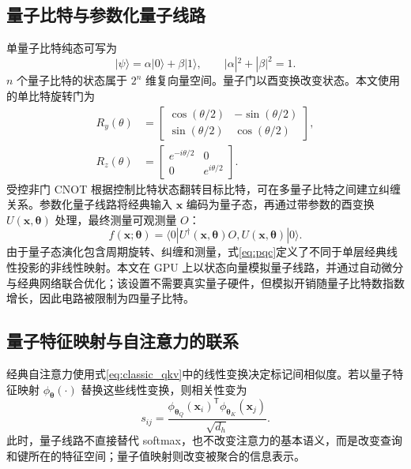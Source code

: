 \documentclass[journal]{IEEEtran}
\begin{document}
\subsection{量子比特与参数化量子线路}

单量子比特纯态可写为
\begin{equation}
  |\psi\rangle=\alpha|0\rangle+\beta|1\rangle,
  \qquad |\alpha|^2+|\beta|^2=1.
\end{equation}
$n$ 个量子比特的状态属于 $2^n$ 维复向量空间。量子门以酉变换改变状态。本文使用的单比特旋转门为
\begin{align}
  R_y(\theta)&=
  \begin{bmatrix}
    \cos(\theta/2)&-\sin(\theta/2)\\
    \sin(\theta/2)& \cos(\theta/2)
  \end{bmatrix},\\
  R_z(\theta)&=
  \begin{bmatrix}
    e^{-i\theta/2}&0\\
    0&e^{i\theta/2}
  \end{bmatrix}.
\end{align}
受控非门 CNOT 根据控制比特状态翻转目标比特，可在多量子比特之间建立纠缠关系。参数化量子线路将经典输入 $\bm{x}$ 编码为量子态，再通过带参数的酉变换 $U(\bm{x},\bm{\theta})$ 处理，最终测量可观测量 $O$：
\begin{equation}
  f(\bm{x};\bm{\theta})=
  \langle0|U^{\dagger}(\bm{x},\bm{\theta})
  O,U(\bm{x},\bm{\theta})|0\rangle.
  \label{eq:pqc}
\end{equation}
由于量子态演化包含周期旋转、纠缠和测量，式\eqref{eq:pqc}定义了不同于单层经典线性投影的非线性映射。本文在 GPU 上以状态向量模拟量子线路，并通过自动微分与经典网络联合优化；该设置不需要真实量子硬件，但模拟开销随量子比特数指数增长，因此电路被限制为四量子比特。

\subsection{量子特征映射与自注意力的联系}

经典自注意力使用式\eqref{eq:classic_qkv}中的线性变换决定标记间相似度。若以量子特征映射 $\phi_{\bm{\theta}}(\cdot)$ 替换这些线性变换，则相关性变为
\begin{equation}
  s_{ij}=
  \frac{
    \phi_{\bm{\theta}_Q}(\bm{x}_i)^{\mathsf T}
    \phi_{\bm{\theta}_K}(\bm{x}_j)
  }{\sqrt{d_h}}.
  \label{eq:quantum_similarity}
\end{equation}
此时，量子线路不直接替代 softmax，也不改变注意力的基本语义，而是改变查询和键所在的特征空间；量子值映射则改变被聚合的信息表示。
\end{document}
